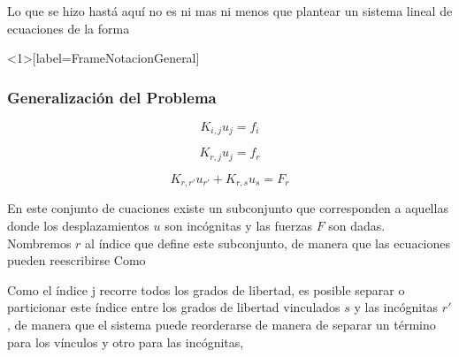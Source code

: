 
Lo que se hizo hastá aquí no es ni mas ni menos que plantear un sistema lineal
de ecuaciones de la forma

\mode*
\begin{frame}<1>[label=FrameNotacionGeneral]
  \frametitle<presentation>{Generalización del Problema}

  \begin{equation}
    K_{i,j} u_j  = f_i
  \end{equation}


  \begin{equation}
    K_{r,j} u_j  = f_r
  \end{equation}



  \begin{equation}
    K_{r, r'} u_{r'}  + K_{r,s} u_s = F_r
  \end{equation}

\end{frame}


En este conjunto de cuaciones existe un subconjunto que corresponden a
aquellas donde los desplazamientos  $u$  son incógnitas y las fuerzas $F$  son dadas.
Nombremos $r$ al índice que define este subconjunto, de manera que las ecuaciones
pueden reescribirse Como

\mode*



 Como el índice j recorre todos los grados de libertad, es posible separar o particionar este
 índice entre los grados de libertad vinculados $s$ y las incógnitas $r'$, 
 de manera que el sistema puede reorderarse de
manera de separar un término para los vínculos y otro para las incógnitas, 

\mode*


